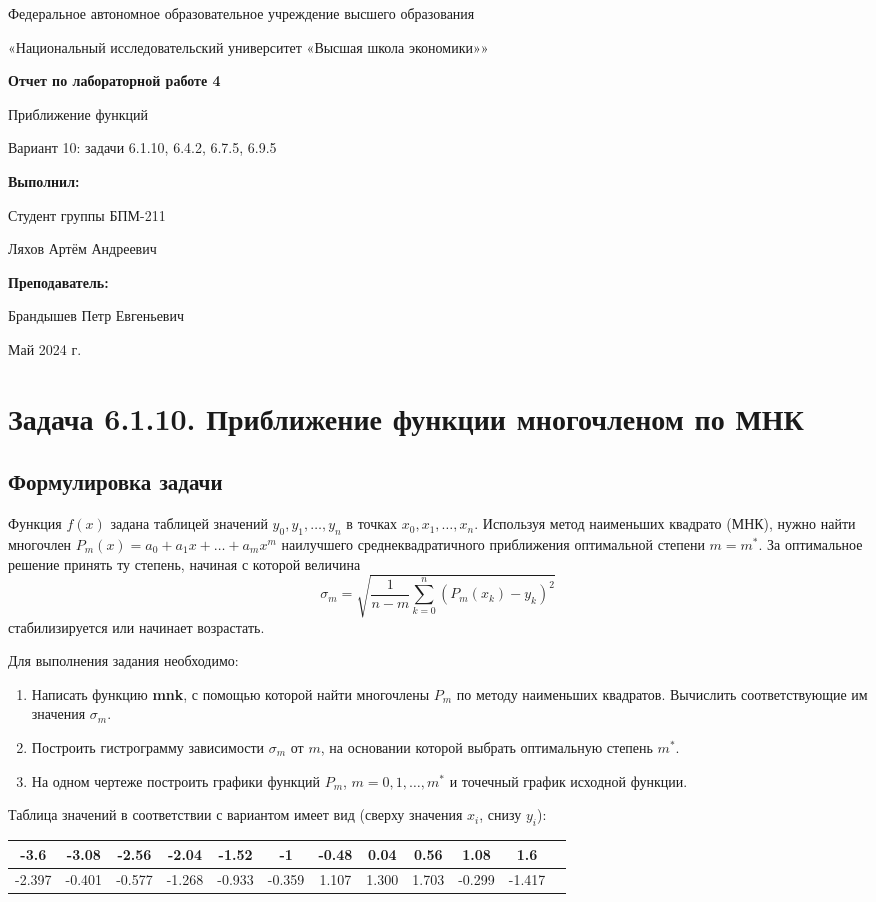 \documentclass[12pt]{article}%
\date{}{Май 2024 г.}
\newcommand*{\Title}{\begingroup
\centering 

\large {Федеральное автономное образовательное учреждение высшего образования}
\vspace*{\baselineskip}

\large {«Национальный исследовательский университет «Высшая школа экономики»»}
\vspace*{\baselineskip}

\vspace*{\baselineskip}
\large{\textbf{Отчет по лабораторной работе 4}}

\vspace{0.1cm}
\large{Приближение функций}

\vspace{0.2cm}
\large{Вариант 10: задачи 6.1.10, 6.4.2, 6.7.5, 6.9.5}

\vspace{1.5cm} 

\begin{flushright}
  \textbf{\normalsize Выполнил:}
  
  \vspace{0.3cm} 
  {\normalsize Студент группы БПМ-211}
  
  {\normalsize Ляхов Артём Андреевич}

\end{flushright}


\vspace{0.2cm}  
\begin{flushright}
  \textbf{\normalsize Преподаватель:} 

  \vspace{0.2cm}

 {\normalsize Брандышев Петр Евгеньевич}
 
\end{flushright}

\vfill
\date{}{Май 2024 г.}


\endgroup\clearpage}
\begin{document}
\Title
\tableofcontents

\newpage
\section{Задача 6.1.10. Приближение функции многочленом по МНК}
\subsection{Формулировка задачи}
Функция $f(x)$ задана таблицей значений $y_0, y_1, \dots, y_n$ в точках $x_0, x_1, \dots, x_n$. Используя метод наименьших квадрато (МНК), нужно найти многочлен $P_m(x) = a_0 + a_1 x + \dots + a_m x^m$ наилучшего среднеквадратичного приближения оптимальной степени $m=m^*$. За оптимальное решение принять ту степень, начиная с которой величина
\[
\sigma_m = \sqrt{\frac{1}{n - m} \sum\limits_{k=0}^{n} 
\left( P_m(x_k) - y_k \right)^2}
\]
стабилизируется или начинает возрастать.

Для выполнения задания необходимо:
\begin{enumerate}
    \item Написать функцию \textbf{mnk}, с помощью которой найти многочлены $P_m$ по методу наименьших квадратов. Вычислить соответствующие им значения $\sigma_m$.
    \item Построить гистрограмму зависимости $\sigma_m$ от $m$, на основании которой выбрать оптимальную степень $m^*$.
    \item На одном чертеже построить графики функций $P_m$, $m = 0, 1, \dots, m^*$ и точечный график исходной функции.
\end{enumerate}

Таблица значений в соответствии с вариантом имеет вид (сверху значения $x_i$, снизу $y_i$):

\begin{table}[h]
\centering
\hspace{0.1cm}
\begin{tabular}{|c|c|c|c|c|c|c|c|c|c|c|c|}
\hline
-3.6 & -3.08 & -2.56 & -2.04 & -1.52 & 
-1 & -0.48 & 0.04 & 0.56 & 1.08 & 1.6  \\
\hline
-2.397 & -0.401 & -0.577 & -1.268 & -0.933 &
-0.359 & 1.107 & 1.300 & 1.703 & -0.299 & -1.417 \\
\hline
\end{tabular}
\end{table}
\end{document}
